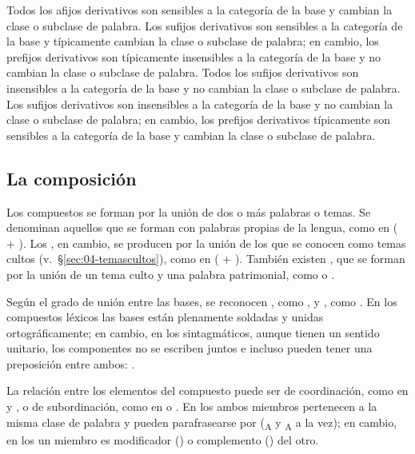 \begin{ejercicio}
\begin{exe}
  \ex Todos los afijos derivativos son sensibles a la categoría de la base y
      cambian la clase o subclase de palabra.
  \ex Los sufijos derivativos son sensibles a la categoría de la base y
      típicamente cambian la clase o subclase de palabra; en cambio, los
      prefijos derivativos son típicamente insensibles a la categoría de la base
      y no cambian la clase o subclase de palabra.
  \ex Todos los sufijos derivativos son insensibles a la categoría de la base y
      no cambian la clase o subclase de palabra.
  \ex Los sufijos derivativos son insensibles a la categoría de la base y no
      cambian la clase o subclase de palabra; en cambio, los prefijos
      derivativos típicamente son sensibles a la categoría de la base y cambian
      la clase o subclase de palabra.
\end{exe}
\end{ejercicio}

\subsection{La composición}\label{sec:04-composicion}

Los compuestos se forman por la unión de dos o más palabras o temas. Se
denominan  aquellos que se forman con
palabras propias de la lengua, como en  ( +
). Los , en cambio, se producen
por la unión de los que se conocen como temas cultos
(v.~§\ref{sec:04-temascultos}), como en  ( +
). También existen , que se forman por
la unión de un tema culto y una palabra patrimonial, como  o
.

Según el grado de unión entre las bases, se reconocen , como , y
, como . En los compuestos léxicos las bases están plenamente soldadas y
unidas ortográficamente; en cambio, en los sintagmáticos, aunque tienen un
sentido unitario, los componentes no se escriben juntos e incluso pueden tener
una preposición entre ambos: .

La relación entre los elementos del compuesto puede ser de coordinación, como en
 y , o de subordinación, como en
 o . En los  ambos miembros pertenecen a la misma clase de palabra y pueden
parafrasearse por  (\textsubscript{A} y
\textsubscript{A} a la vez); en cambio, en los  un miembro es modificador () o complemento
() del otro.

